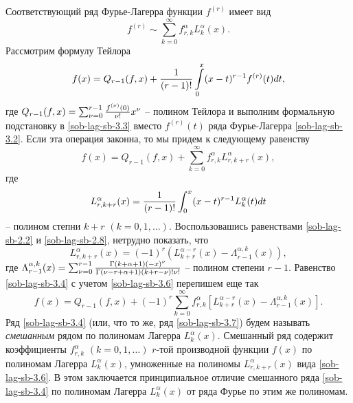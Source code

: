 Соответствующий ряд Фурье-Лагерра функции $f^{(r)}$ имеет вид
     \begin{equation}\label{sob-lag-sb-3.2}
f^{(r)}\sim\sum_{k=0}^\infty f_{r,k}^\alpha
L_k^\alpha(x).
     \end{equation}
Рассмотрим формулу Тейлора
\begin{equation}\label{sob-lag-sb-3.3}
f(x)=Q_{r-1}(f,x)+{1\over (r-1)!}\int\limits_{0}^x(x-t)^{r-1}
     f^{(r)}(t)dt,
     \end{equation}
     где $Q_{r-1}(f,x) =\sum_{\nu=0}^{r-1}{f^{(\nu)}(0)\over\nu!}x^\nu$ --
полином Тейлора и выполним формальную подстановку в \eqref{sob-lag-sb-3.3} вместо
$f^{(r)}(t)$ ряда Фурье-Лагерра \eqref{sob-lag-sb-3.2}. Если эта операция
законна, то мы придем к следующему равенству
  \begin{equation}\label{sob-lag-sb-3.4}
f(x)=Q_{r-1}(f,x)+
\sum_{k=0}^\infty f_{r,k}^\alpha L_{r,k+r}^\alpha(x),
\end{equation}
где
\begin{equation}\label{sob-lag-sb-3.5}
L_{r,k+r}^\alpha(x)={1\over (r-1)!}\int_{0}^x(x-t)^{r-1}L^\alpha_k(t)dt
\end{equation}
-- полином степни $k+r$ $( k=0,1,\ldots)$. Воспользовашись  равенствами  \eqref{sob-lag-sb-2.2} и  \eqref{sob-lag-sb-2.8}, нетрудно показать, что
 \begin{equation}\label{sob-lag-sb-3.6}
L_{r,k+r}^\alpha(x)=(-1)^r(L_{k+r}^{\alpha-r}(x)-\Lambda_{r-1}^{\alpha,k}(x)),
\end{equation}
где
$
\Lambda_{r-1}^{\alpha,k}(x)=     \sum_{\nu=0}^{r-1}
{\Gamma(k+\alpha+1)(-x)^\nu\over\Gamma(\nu-r+\alpha+1)(k+r-\nu)!\nu!}
$
-- полином степени $r-1$. Равенство \eqref{sob-lag-sb-3.4} с учетом \eqref{sob-lag-sb-3.6} перепишем еще так
 \begin{equation}\label{sob-lag-sb-3.7}
  f(x)=Q_{r-1}(f,x)+(-1)^r\sum_{k=0}^\infty f_{r,k}^\alpha
[L_{k+r}^{\alpha-r}(x)-\Lambda_{r-1}^{\alpha,k}(x)].
 \end{equation}
  Ряд  \eqref{sob-lag-sb-3.4} (или, что то же, ряд \eqref{sob-lag-sb-3.7})  будем называть \cite{sob-lag-sb-Shar13} \textit{смешанным} рядом по полиномам Лагерра
$L_k^\alpha(x)$. Смешанный ряд содержит
     коэффициенты $f_{r,k}^\alpha$ $(k=0,1,\ldots)$ $r$-той производной
     функции $f(x)$ по полиномам Лагерра $L_k^\alpha(x)$, умноженные
     на полиномы  $L_{r,k+r}^{\alpha}(x)$ вида \eqref{sob-lag-sb-3.6}. В этом
     заключается принципиальное отличие смешанного ряда \eqref{sob-lag-sb-3.4}
     по полиномам Лагерра $L_k^\alpha(x)$ от ряда Фурье    по этим же полиномам.
